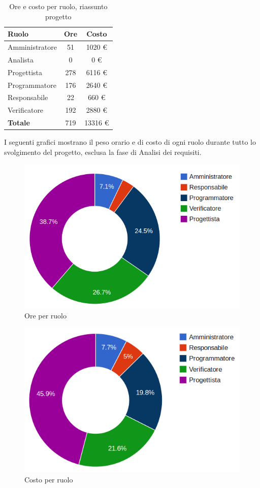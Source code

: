 \begin{table}[H]
	\centering
	\begin{tabular}{ l c c }
	\textbf{Ruolo} & \textbf{Ore} & \textbf{Costo} \\
	\hline
	Amministratore & 51 & 1020 €\\
	Analista & 0 & 0 €\\
	Progettista & 278 & 6116 €\\
	Programmatore & 176 & 2640 €\\
	Responsabile & 22 & 660 €\\
	Verificatore & 192 & 2880 €\\
	\hline
	\textbf{Totale} & 719 & 13316 €\\
	\hline
	\end{tabular}
	\caption{Ore e costo per ruolo, riassunto progetto}
	\end{table}

I seguenti grafici mostrano il peso orario e di costo di ogni ruolo durante tutto lo svolgimento del progetto, esclusa la fase di Analisi dei requisiti.

\begin{figure}[H]
\centering
\includegraphics[scale=0.35]{5-5-1.png}
\caption{Ore per ruolo\label{fig:nome}}
\end{figure}

\begin{figure}[H]
\centering
\includegraphics[scale=0.4]{5-5-2.png}
\caption{Costo per ruolo\label{fig:nome}}
\end{figure}
